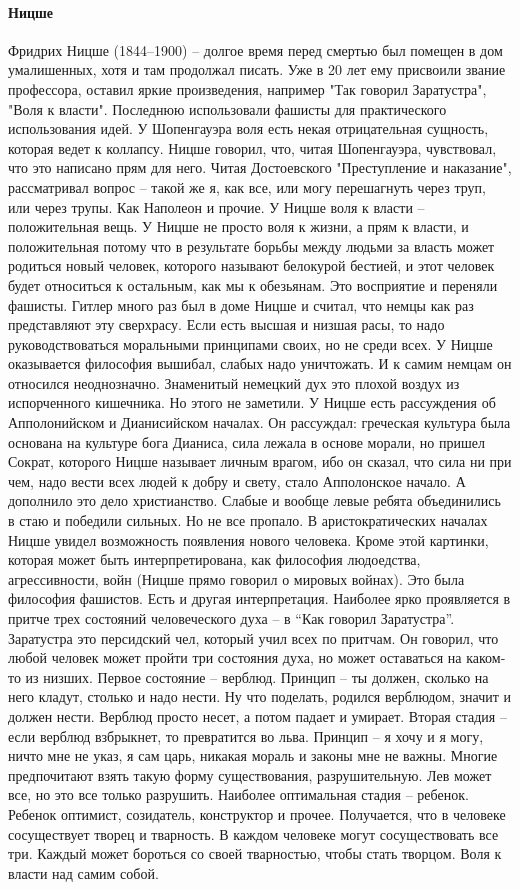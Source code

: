 \documentclass[a4paper, 12pt]{article}
\begin{document}
\paragraph{Ницше} Фридрих Ницше (1844--1900) -- долгое время перед смертью был помещен в дом умалишенных, хотя и там продолжал писать. Уже в 20 лет ему присвоили звание профессора, оставил яркие произведения, например "Так говорил Заратустра"{}, "Воля к власти". Последнюю использовали фашисты для практического использования идей. У Шопенгауэра воля есть некая отрицательная сущность, которая ведет к коллапсу. Ницше говорил, что, читая Шопенгауэра, чувствовал, что это написано прям для него. Читая Достоевского "Преступление и наказание"{}, рассматривал вопрос -- такой же я, как все, или могу перешагнуть через труп, или через трупы. Как Наполеон и прочие. У Ницше воля к власти -- положительная вещь. У Ницше не просто воля к жизни, а прям к власти, и положительная потому что в результате борьбы между людьми за власть может родиться новый человек, которого называют белокурой бестией, и этот человек будет относиться к остальным, как мы к обезьянам. Это восприятие и переняли фашисты. Гитлер много раз был в доме Ницше и считал, что немцы как раз представляют эту сверхрасу. Если есть высшая и низшая расы, то надо руководствоваться моральными принципами своих, но не среди всех. У Ницше оказывается философия вышибал, слабых надо уничтожать. И к самим немцам он относился неоднозначно. Знаменитый немецкий дух это плохой воздух из испорченного кишечника. Но этого не заметили. У Ницше есть рассуждения об Апполонийском и Дианисийском началах. Он рассуждал: греческая культура была основана на культуре бога Дианиса, сила лежала в основе морали, но пришел Сократ, которого Ницше называет личным врагом, ибо он сказал, что сила ни при чем, надо вести всех людей к добру и свету, стало Апполонское начало. А дополнило это дело христианство. Слабые и вообще левые ребята объединились в стаю и победили сильных. Но не все пропало. В аристократических началах Ницше увидел возможность появления нового человека. Кроме этой картинки, которая может быть интерпретирована, как философия людоедства, агрессивности, войн (Ницше прямо говорил о мировых войнах). Это была философия фашистов. Есть и другая интерпретация. Наиболее ярко проявляется в притче трех состояний человеческого духа -- в ``Как говорил Заратустра''. Заратустра это персидский чел, который учил всех по притчам. Он говорил, что любой человек может пройти три состояния духа, но может оставаться на каком-то из низших. Первое состояние -- верблюд. Принцип -- ты должен, сколько на него кладут, столько и надо нести. Ну что поделать, родился верблюдом, значит и должен нести. Верблюд просто несет, а потом падает и умирает. Вторая стадия -- если верблюд взбрыкнет, то превратится во льва. Принцип -- я хочу и я могу, ничто мне не указ, я сам царь, никакая мораль и законы мне не важны. Многие предпочитают взять такую форму существования, разрушительную. Лев может все, но это все только разрушить. Наиболее оптимальная стадия -- ребенок. Ребенок оптимист, созидатель, конструктор и прочее. Получается, что в человеке сосуществует творец и тварность. В каждом человеке могут сосуществовать все три. Каждый может бороться со своей тварностью, чтобы стать творцом. Воля к власти над самим собой. 
\end{document}
